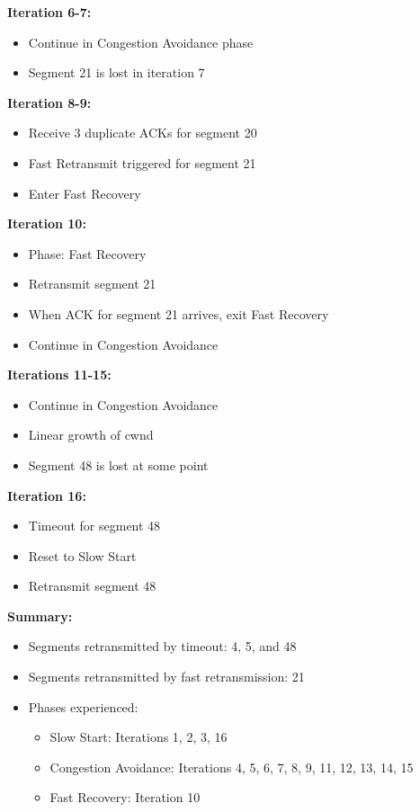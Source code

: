 \documentclass[11pt,a4paper]{article}
\begin{document}
\begin{tcolorbox}[title=Iteration-by-Iteration Analysis]
\textbf{Iteration 6-7:}
\begin{itemize}
    \item Continue in Congestion Avoidance phase
    \item Segment 21 is lost in iteration 7
\end{itemize}

\textbf{Iteration 8-9:}
\begin{itemize}
    \item Receive 3 duplicate ACKs for segment 20
    \item Fast Retransmit triggered for segment 21
    \item Enter Fast Recovery
\end{itemize}

\textbf{Iteration 10:}
\begin{itemize}
    \item Phase: Fast Recovery
    \item Retransmit segment 21
    \item When ACK for segment 21 arrives, exit Fast Recovery
    \item Continue in Congestion Avoidance
\end{itemize}

\textbf{Iterations 11-15:}
\begin{itemize}
    \item Continue in Congestion Avoidance
    \item Linear growth of cwnd
    \item Segment 48 is lost at some point
\end{itemize}

\textbf{Iteration 16:}
\begin{itemize}
    \item Timeout for segment 48
    \item Reset to Slow Start
    \item Retransmit segment 48
\end{itemize}
\end{tcolorbox}

\textbf{Summary:}
\begin{itemize}
    \item Segments retransmitted by timeout: 4, 5, and 48
    \item Segments retransmitted by fast retransmission: 21
    \item Phases experienced:
    \begin{itemize}
        \item Slow Start: Iterations 1, 2, 3, 16
        \item Congestion Avoidance: Iterations 4, 5, 6, 7, 8, 9, 11, 12, 13, 14, 15
        \item Fast Recovery: Iteration 10
    \end{itemize}
\end{itemize}
\end{document}
